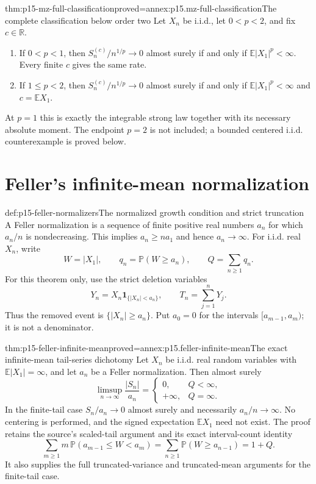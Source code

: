 \begin{hbtheorem}{thm:p15-mz-full-classification}{proved=annex:p15.mz-full-classification}{The complete classification below order two}
Let \(X_n\) be i.i.d., let \(0<p<2\), and fix \(c\in\mathbb R\).
\begin{enumerate}
\item If \(0<p<1\), then \(S_n^{(c)}/n^{1/p}\to0\) almost surely
if and only if \(\mathbb E|X_1|^p<\infty\). Every finite \(c\)
gives the same rate.
\item If \(1\leq p<2\), then \(S_n^{(c)}/n^{1/p}\to0\) almost
surely if and only if \(\mathbb E|X_1|^p<\infty\) and
\(c=\mathbb EX_1\).
\end{enumerate}
At \(p=1\) this is exactly the integrable strong law together with
its necessary absolute moment. The endpoint \(p=2\) is not included;
a bounded centered i.i.d. counterexample is proved below.
\end{hbtheorem}

\section{Feller's infinite-mean normalization}
\label{sec:p15-feller-normalization}

\begin{hbdefinition}{def:p15-feller-normalizers}{The normalized growth condition and strict truncation}
A Feller normalization is a sequence of finite positive real numbers
\(a_n\) for which \(a_n/n\) is nondecreasing. This implies
\(a_n\geq n a_1\) and hence \(a_n\to\infty\).
For i.i.d. real \(X_n\), write
\[
 W=|X_1|,\qquad q_n=\mathbb P(W\geq a_n),\qquad
 Q=\sum_{n\geq1}q_n.
\]
For this theorem only, use the strict deletion variables
\[
 Y_n=X_n\mathbf1_{\{|X_n|<a_n\}},\qquad T_n=\sum_{j=1}^nY_j.
\]
Thus the removed event is \(\{|X_n|\geq a_n\}\). Put \(a_0=0\)
for the intervals \([a_{m-1},a_m)\); it is not a denominator.
\end{hbdefinition}

\begin{hbtheorem}{thm:p15-feller-infinite-mean}{proved=annex:p15.feller-infinite-mean}{The exact infinite-mean tail-series dichotomy}
Let \(X_n\) be i.i.d. real random variables with
\(\mathbb E|X_1|=\infty\), and let \(a_n\) be a Feller
normalization. Then almost surely
\[
 \limsup_{n\to\infty}\frac{|S_n|}{a_n}
   =\begin{cases}
      0,&Q<\infty,\\
      +\infty,&Q=\infty.
     \end{cases}
\]
In the finite-tail case \(S_n/a_n\to0\) almost surely and necessarily
\(a_n/n\to\infty\). No centering is performed, and the signed
expectation \(\mathbb EX_1\) need not exist.
The proof retains the source's scaled-tail argument and its exact
interval-count identity
\[
 \sum_{m\geq1}m\,\mathbb P(a_{m-1}\leq W<a_m)
       =\sum_{n\geq1}\mathbb P(W\geq a_{n-1})=1+Q.
\]
It also supplies the full truncated-variance and truncated-mean arguments
for the finite-tail case.
\end{hbtheorem}

